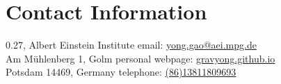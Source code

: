 \section{\sc Contact Information}
0.27, Albert Einstein Institute      \hfill email: \href{mailto:gaoyong.physics@pku.edu.cn}{yong.gao@aei.mpg.de}\\
Am Mühlenberg 1, Golm \hfill personal webpage: \href{https://gravyong.github.io/}{gravyong.github.io}\\
Potsdam 14469, Germany                                \hfill telephone: \href{tel:8613811809693}{(86)13811809693}


